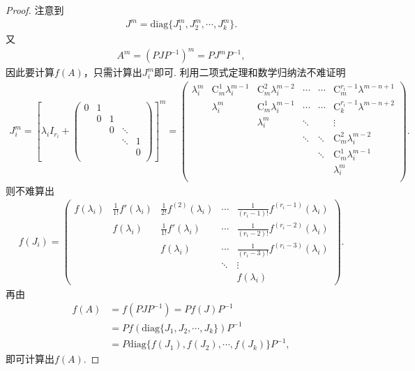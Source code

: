 \documentclass[../../main.tex]{subfiles}%
\begin{document}
\begin{proof}

注意到
\begin{align*}
J^m = \mathrm{diag}\{J_1^m,J_2^m,\cdots,J_k^m\}.
\end{align*}
又
\begin{align*}
A^m = (PJP^{-1})^m = PJ^mP^{-1},
\end{align*}
因此要计算\(f(A)\)，只需计算出\(J_i^m\)即可. 
利用二项式定理和数学归纳法不难证明
\begin{align*}
J_{i}^{m}=\left[ \lambda _iI_{r_i}+\left( \begin{matrix}
0&		1&		&		&		\\
&		0&		1&		&		\\
&		&		0&		\ddots&		\\
&		&		&		\ddots&		1\\
&		&		&		&		0\\
\end{matrix} \right) \right] ^m=\left( \begin{matrix}
\lambda _{i}^{m}&		\mathrm{C}_{m}^{1}\lambda _{i}^{m-1}&		\mathrm{C}_{m}^{2}\lambda _{i}^{m-2}&		\cdots&		\cdots&		\mathrm{C}_{m}^{r_i-1}\lambda ^{m-n+1}\\
&		\lambda _{i}^{m}&		\mathrm{C}_{m}^{1}\lambda _{i}^{m-1}&		\cdots&		\cdots&		\mathrm{C}_{k}^{r_i-1}\lambda ^{m-n+2}\\
&		&		\lambda _{i}^{m}&		\ddots&		&		\vdots\\
&		&		&		\ddots&		\ddots&		\mathrm{C}_{m}^{2}\lambda _{i}^{m-2}\\
&		&		&		&		\ddots&		\mathrm{C}_{m}^{1}\lambda _{i}^{m-1}\\
&		&		&		&		&		\lambda _{i}^{m}\\
\end{matrix} \right) .
\end{align*}
则不难算出
\begin{align*}
f(J_i)= \begin{pmatrix}
f(\lambda_i) & \frac{1}{1!}f'(\lambda_i) & \frac{1}{2!}f^{(2)}(\lambda_i) & \cdots & \frac{1}{(r_i - 1)!}f^{(r_i - 1)}(\lambda_i) \\
& f(\lambda_i) & \frac{1}{1!}f'(\lambda_i) & \cdots & \frac{1}{(r_i - 2)!}f^{(r_i - 2)}(\lambda_i) \\
& & f(\lambda_i) & \cdots & \frac{1}{(r_i - 3)!}f^{(r_i - 3)}(\lambda_i) \\
& & & \ddots & \vdots \\
& & & & f(\lambda_i)
\end{pmatrix}. 
\end{align*}
再由
\begin{align*}
f(A) &= f(PJP^{-1}) = Pf(J)P^{-1} \\
&= P f(\mathrm{diag}\{J_1,J_2,\cdots,J_k\})P^{-1} \\
&= P \mathrm{diag}\{f(J_1),f(J_2),\cdots,f(J_k)\}P^{-1},
\end{align*}
即可计算出\(f(A)\). 

\end{proof}
\end{document}
